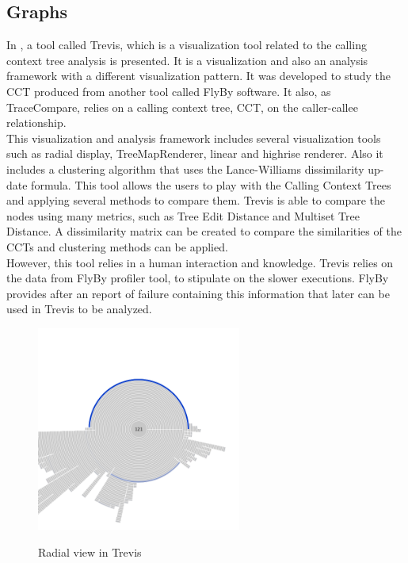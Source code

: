 \subsection{Graphs}
In \cite{trevis}, a tool called Trevis, which is a visualization tool related to the calling context tree analysis is presented. It is a visualization and also an analysis framework with a different visualization pattern. It was developed to study the CCT produced from another tool called FlyBy software. It also, as TraceCompare, relies on a calling context tree, CCT, on the caller-callee relationship.\\

This visualization and analysis framework includes several visualization tools such as radial display, TreeMapRenderer, linear  and highrise renderer. Also it includes a clustering algorithm that uses the Lance-Williams dissimilarity up-
date formula.
This tool allows the users to play with the Calling Context Trees and applying several methods to compare them. Trevis is able to compare the nodes using many metrics, such as Tree Edit Distance and Multiset Tree Distance. A dissimilarity matrix can be created to compare the similarities of the CCTs and clustering methods can be applied.\\
However, this tool relies in a human interaction and knowledge. Trevis relies on the data from FlyBy profiler tool, to stipulate on the slower executions. FlyBy provides after an report of failure containing this information that later can be used in Trevis to be analyzed.

\begin{figure}[h]
          \center
          \caption{Radial view in Trevis}
            \includegraphics[width=0.60\textwidth]{figures/ring-600-color.png}
            \label{fig:RadialView}
\end{figure}
    
